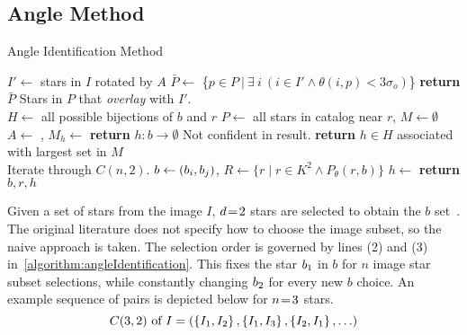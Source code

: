 \subsection{Angle Method}\label{subsec:angleMethod}
\newcommand{\invalidBijection}{\If{$\forall \ \vv{b^\star}, \ \vv{b^\star} \in b \land h\left(\vv{b^\star}\right)
\neq \emptyset$}}
\begin{algorithm}
    \caption{Angle Identification Method} \label{algorithm:angleIdentification}
    \begin{algorithmic}[1]
        \State $I' \gets$ stars in $I$ rotated by $A$
        \State $\bar{P} \gets $ \{$p \in P \ | \ \exists \ i \ (i \in I' \land \theta (i, p) < 3\sigma_o)$\}
        \State \textbf{return} $\bar{P}$ \Comment Stars in $P$ that \textit{overlay} with $I'$.
        \EndFunction
        \\
        \State $H \gets $ all possible bijections of $b$ and $r$
        \State $P \gets $ all stars in catalog near $r$, $M \gets \emptyset$
        \State $A \gets $ , $M_h \gets $ 
        \EndFor
        \State \textbf{return} $h : b \rightarrow \emptyset $ \Comment Not confident in result.
        \Else
        \State \textbf{return} $h \in H$ associated with largest set in $M$
        \EndIf
        \EndFunction
        \\
         \Comment Iterate through $C(n, 2)$.
        \State $b \gets \left(b_i, b_j\right)$, $R \gets \{ r \mid r \in K^2 \land P_\theta(r, b) \}$
        \State $h \gets $  %
        \invalidBijection
        \State \textbf{return} $b, r, h$
        \EndIf
        \EndIf
        \EndFor
        \EndFor
        \EndFunction
    \end{algorithmic}
\end{algorithm}

Given a set of stars from the image $I$, $d \!=\! 2$ stars are selected to obtain the $b$
set~\cite{gottlieb:spacecraftAttitudeDetermination}.
The original literature does not specify how to choose the image subset, so the naive approach is taken.
The selection order is governed by lines (2) and (3) in~\autoref{algorithm:angleIdentification}.
This fixes the star $b_1$ in $b$ for $n$ image star subset selections, while constantly changing
$b_2$ for every new $b$ choice.
An example sequence of pairs is depicted below for $n \!=\! 3$ stars.
\begin{equation}
    C(3, 2) \text{ of } I = \left(\left\{ I_1, I_2 \right\}, \left\{ I_1,I_3 \right\}, \left\{ I_2,I_1 \right\},
    \ldots \right)
\end{equation}

